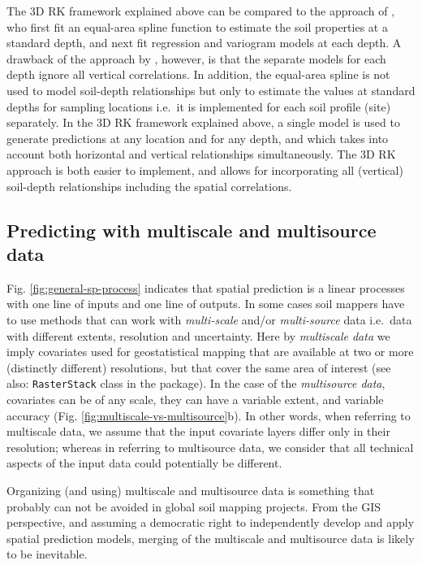 \documentclass[11pt]{krantz}
\theoremstyle{definition}
\theoremstyle{definition}
\theoremstyle{definition}
\theoremstyle{remark}
\begin{document}
The 3D RK framework explained above can be compared to the approach of
\citet{Malone2009Geoderma}, who first fit an equal-area spline function
to estimate the soil properties at a standard depth, and next fit
regression and variogram models at each depth. A drawback of the
approach by \citet{Malone2009Geoderma}, however, is that the separate
models for each depth ignore all vertical correlations. In addition, the
equal-area spline is not used to model soil-depth relationships but only
to estimate the values at standard depths for sampling locations i.e.~it
is implemented for each soil profile (site) separately. In the 3D RK
framework explained above, a single model is used to generate
predictions at any location and for any depth, and which takes into
account both horizontal and vertical relationships simultaneously. The
3D RK approach is both easier to implement, and allows for incorporating
all (vertical) soil-depth relationships including the spatial
correlations.

\hypertarget{multiscale}{%
\subsection{Predicting with multiscale and multisource
data}\label{multiscale}}

Fig. \ref{fig:general-sp-process} indicates that spatial prediction is a
linear processes with one line of inputs and one line of outputs. In
some cases soil mappers have to use methods that can work with
\emph{multi-scale} and/or \emph{multi-source} data i.e.~data with
different extents, resolution and uncertainty. Here by \emph{multiscale
data} we imply covariates used for geostatistical mapping that are
available at two or more (distinctly different) resolutions, but that
cover the same area of interest (see also: \texttt{RasterStack} class in
the package). In the case of the \emph{multisource data}, covariates can
be of any scale, they can have a variable extent, and variable accuracy
(Fig. \ref{fig:multiscale-vs-multisource}b). In other words, when
referring to multiscale data, we assume that the input covariate layers
differ only in their resolution; whereas in referring to multisource
data, we consider that all technical aspects of the input data could
potentially be different.

Organizing (and using) multiscale and multisource data is something that
probably can not be avoided in global soil mapping projects. From the
GIS perspective, and assuming a democratic right to independently
develop and apply spatial prediction models, merging of the multiscale
and multisource data is likely to be inevitable.
\end{document}
